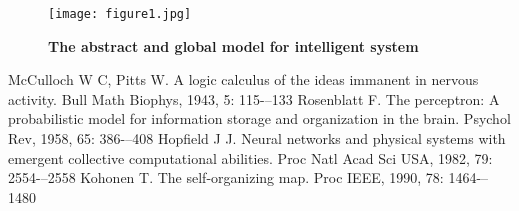 \documentclass[a4paper,12pt,twocolumn]{article}
\begin{document}
		\begin{figure}[htp]
		\centering
		\texttt{[image: figure1.jpg]}
		\caption{\bfseries{ The abstract and global model for intelligent system}}\label{pic1}
	\end{figure}


	\begin{thebibliography}{99}
	  McCulloch W C, Pitts W. A logic calculus of the ideas immanent in nervous activity. Bull Math Biophys, 1943, 5: 115-–133
	  Rosenblatt F. The perceptron: A probabilistic model for information storage and organization in the brain. Psychol Rev, 1958, 65: 386-–408 
	   Hopfield J J. Neural networks and physical systems with emergent collective computational abilities. Proc Natl Acad Sci USA, 1982, 79: 2554-–2558
	  Kohonen T. The self-organizing map. Proc IEEE, 1990, 78: 1464-–1480 
\end{thebibliography}
\end{document}
